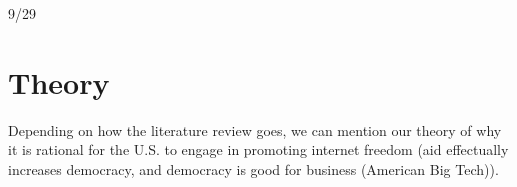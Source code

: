 9/29
\section*{Theory}
Depending on how the literature review goes, we can mention our theory of why it is rational for the U.S. to engage in promoting internet freedom (aid effectually increases democracy, and democracy is good for business (American Big Tech)).

